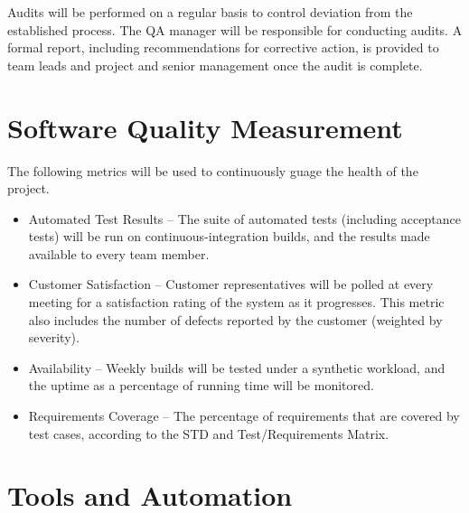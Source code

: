 \documentclass[11pt]{wacomepd}
\begin{document}
Audits will be performed on a regular basis to control deviation from the established process.  The
QA manager will be responsible for conducting audits.  A formal report, including recommendations
for corrective action, is provided to team leads and project and senior management once the audit is
complete.



\chapter{Software Quality Measurement}
\label{metrics}

The following metrics will be used to continuously guage the health of the project.

\begin{itemize}
\item {\sc Automated Test Results} -- The suite of automated tests (including acceptance tests) will
  be run on continuous-integration builds, and the results made available to every team member.
\item {\sc Customer Satisfaction} -- Customer representatives will be polled at every meeting for a
  satisfaction rating of the system as it progresses.  This metric also includes the number of
  defects reported by the customer (weighted by severity).
\item {\sc Availability} -- Weekly builds will be tested under a synthetic workload, and the uptime
  as a percentage of running time will be monitored.
\item {\sc Requirements Coverage} -- The percentage of requirements that are covered by test cases,
  according to the STD and Test/Requirements Matrix.
\end{itemize}




\chapter{Tools and Automation}
\end{document}
